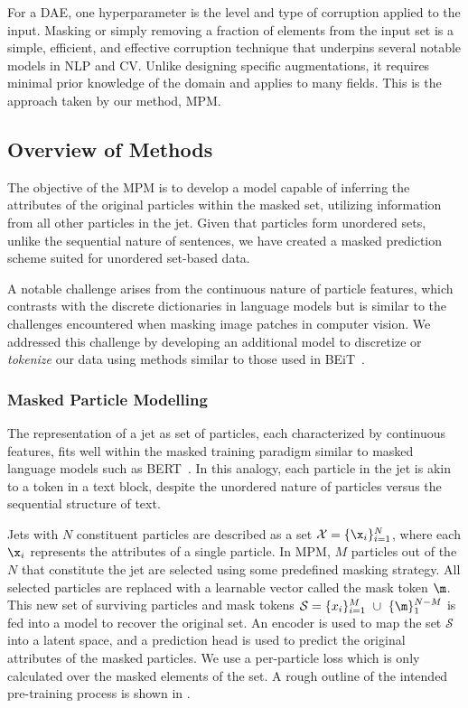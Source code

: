 For a DAE, one hyperparameter is the level and type of corruption applied to the input.
Masking or simply removing a fraction of elements from the input set is a simple, efficient, and effective corruption technique that underpins several notable models in NLP and CV.
Unlike designing specific augmentations, it requires minimal prior knowledge of the domain and applies to many fields.
This is the approach taken by our method, MPM.

\subsection{Overview of Methods}

The objective of the MPM is to develop a model capable of inferring the attributes of the original particles within the masked set, utilizing information from all other particles in the jet.
Given that particles form unordered sets, unlike the sequential nature of sentences, we have created a masked prediction scheme suited for unordered set-based data.

A notable challenge arises from the continuous nature of particle features, which contrasts with the discrete dictionaries in language models but is similar to the challenges encountered when masking image patches in computer vision.
We addressed this challenge by developing an additional model to discretize or \textit{tokenize} our data using methods similar to those used in BEiT~\cite{BEIT}.

\subsubsection{Masked Particle Modelling}
\label{subsec:mpm}

The representation of a jet as set of particles, each characterized by continuous features, fits well within the masked training paradigm similar to masked language models such as BERT~\cite{BERT}.
In this analogy, each particle in the jet is akin to a token in a text block, despite the unordered nature of particles versus the sequential structure of text.

Jets with $N$ constituent particles are described as a set $\mathcal{X}=\{\x_i\}_{i=1}^N$, where each $\x_i$ represents the attributes of a single particle.
In MPM, $M$ particles out of the $N$ that constitute the jet are selected using some predefined masking strategy.
All selected particles are replaced with a learnable vector called the mask token $\m$.
This new set of surviving particles and mask tokens $\mathcal{S}=\{x_i\}_{i=1}^M~\cup~\{\m\}_{1}^{N-M}$ is fed into a model to recover the original set.
An encoder is used to map the set $\mathcal{S}$ into a latent space, and a prediction head is used to predict the original attributes of the masked particles.
We use a per-particle loss which is only calculated over the masked elements of the set.
A rough outline of the intended pre-training process is shown in .


